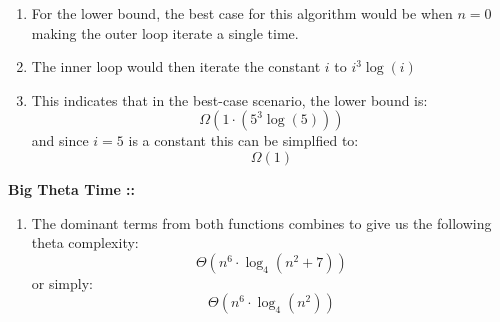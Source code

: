 \documentclass[11pt]{article}
\begin{document}
\begin{enumerate}[1.]
\item
For the lower bound, the best case for this algorithm would be when $n = 0$ making
the outer loop iterate a single time.

\item 
The inner loop would then iterate the constant $i$ to $i^3\log(i)$

\item
This indicates that in the best-case scenario, the lower bound is:
$$\Omega\left(1 \cdot \left(5^3\log(5)\right)\right)$$
and since $i=5$ is a constant this can be simplfied to:
$$\Omega(1)$$
\end{enumerate}
\textbf{Big Theta Time ::}
\begin{enumerate}[1.]
\item 
The dominant terms from both functions combines to give us the following theta
complexity:
$$\Theta\left(n^6\cdot\log_4\left(n^2+7\right)\right)$$
or simply:
$$\Theta\left(n^6\cdot\log_4\left(n^2\right)\right)$$
\end{enumerate}
\pagebreak

\end{document}
